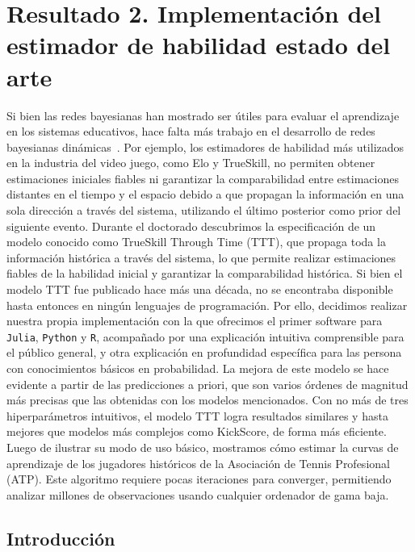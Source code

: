 \documentclass[a4paper,11pt]{book}
\theoremstyle{definition}
\begin{document}
\chapter{Resultado 2. Implementaci\'on del estimador de habilidad estado del arte} \label{ch:ttt}

Si bien las redes bayesianas han mostrado ser \'utiles para evaluar el aprendizaje en los sistemas educativos, hace falta m\'as trabajo en el desarrollo de redes bayesianas din\'amicas~\cite{Almond2015}.
%
Por ejemplo, los estimadores de habilidad m\'as utilizados en la industria del video juego, como Elo y TrueSkill, no permiten obtener estimaciones iniciales fiables ni garantizar la comparabilidad entre estimaciones distantes en el tiempo y el espacio debido a que propagan la informaci\'on en una sola direcci\'on a trav\'es del sistema, utilizando el \'ultimo posterior como prior del siguiente evento.
%
Durante el doctorado descubrimos la especificaci\'on de un modelo conocido como TrueSkill Through Time (TTT), que propaga toda la informaci\'on hist\'orica a trav\'es del sistema, lo que permite realizar estimaciones fiables de la habilidad inicial y garantizar la comparabilidad hist\'orica.
%
Si bien el modelo TTT fue publicado hace m\'as una d\'ecada, no se encontraba disponible hasta entonces en ning\'un lenguajes de programaci\'on.
%
Por ello, decidimos realizar nuestra propia implementaci\'on con la que ofrecimos el primer software para \texttt{Julia}, \texttt{Python} y \texttt{R}, acompa\~nado por una explicaci\'on intuitiva comprensible para el p\'ublico general, y otra explicaci\'on en profundidad espec\'ifica para las persona con conocimientos b\'asicos en probabilidad.
%
La mejora de este modelo se hace evidente a partir de las predicciones a priori, que son varios \'ordenes de magnitud m\'as precisas que las obtenidas con los modelos mencionados.
%
Con no m\'as de tres hiperpar\'ametros intuitivos, el modelo TTT logra resultados similares y hasta mejores que modelos m\'as complejos como KickScore, de forma m\'as eficiente.
%
Luego de ilustrar su modo de uso b\'asico, mostramos c\'omo estimar la curvas de aprendizaje de los jugadores hist\'oricos de la Asociaci\'on de Tennis Profesional (ATP).
%
Este algoritmo requiere pocas iteraciones para converger, permitiendo analizar millones de observaciones usando cualquier ordenador de gama baja.

\section{Introducci\'on} \label{sec:intro}
\end{document}
